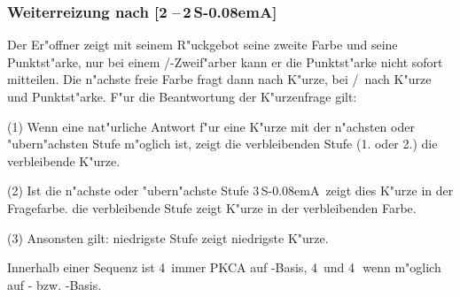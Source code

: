 \documentclass[11pt,german,twocolumn]{scrartcl}
\def\pik{\nobreak\,\Sp\xspace}
\def\coe{\nobreak\,\He\xspace}
\def\kar{\nobreak\,\Di\xspace}
\def\tre{\nobreak\,\Cl\xspace}
\def\co{\He\xspace}
\def\ka{\Di\xspace}
\def\tr{\Cl\xspace}
\def\sa{\nobreak\textsf{S\kern-0.08emA}\xspace}
\def\SA{\nobreak\,\sa}
\def\sep{\,--\,}
\begin{document}
\subsubsection{Weiterreizung nach [2\coe{}\sep2\SA]}

Der Er"offner zeigt mit seinem R"uckgebot seine zweite Farbe und seine
Punktst"arke, nur bei einem \co/\tr-Zweif"arber kann er die Punktst"arke nicht
sofort mitteilen. Die n"achste freie Farbe fragt dann nach K"urze, bei \co/\tr\
nach K"urze und Punktst"arke. F"ur die Beantwortung der K"urzenfrage gilt:

(1) Wenn eine nat"urliche Antwort f"ur eine K"urze mit der n"achsten oder
"ubern"achsten Stufe m"oglich ist, zeigt die verbleibenden Stufe (1. oder 2.)
die verbleibende K"urze.

(2) Ist die n"achste oder "ubern"achste Stufe 3\SA\, zeigt dies K"urze in der
Fragefarbe. die verbleibende Stufe zeigt K"urze in der verbleibenden Farbe.

(3) Ansonsten gilt: niedrigste Stufe zeigt niedrigste K"urze.

Innerhalb einer Sequenz ist 4\pik immer PKCA auf \co-Basis, 4\tre und 4\kar\
wenn m"oglich auf \tr- bzw. \ka-Basis.
\end{document}
